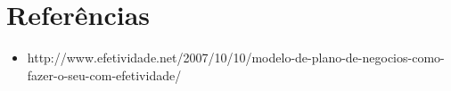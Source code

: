 \documentclass[10pt]{article}
\begin{document}
\section{Referências}

\begin{itemize}
	\item http://www.efetividade.net/2007/10/10/modelo-de-plano-de-negocios-como-fazer-o-seu-com-efetividade/
\end{itemize}
\end{document}
